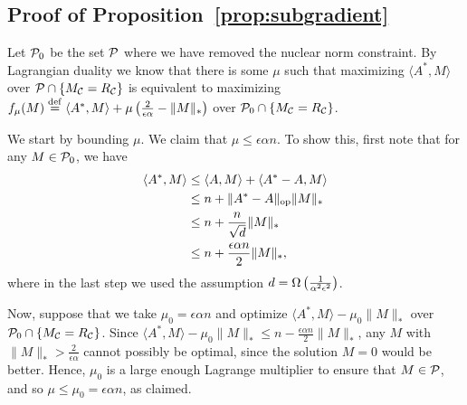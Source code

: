 \documentclass[11pt]{article}
\newcommand{\M}{\tilde{M}}
\newcommand{\Mm}{M^*}
\newcommand{\Aa}{A^*}
\begin{document}

\subsection{Proof of Proposition~\ref{prop:subgradient}}
Let $\mathcal{P}_0$ be the set $\mathcal{P}$ where we have removed the nuclear norm constraint. By Lagrangian duality we 
know that there is some $\mu$ such that maximizing $\langle \Aa, M \rangle$ over $\mathcal{P} \cap \{M_{\mathcal{C}} = R_{\mathcal{C}}\}$ 
is equivalent to maximizing $f_\mu(M) \eqdef \langle \Aa, M \rangle + \mu\p{\frac{2}{\epsilon\alpha} - \|M\|_*}$ over 
$\mathcal{P}_0 \cap \{M_{\mathcal{C}} = R_{\mathcal{C}}\}$. 

We start by bounding $\mu$. We claim that $\mu \leq \epsilon \alpha n$. 
To show this, first note that for any $M \in \mathcal{P}_0$, we have 
\begin{align}
\langle \Aa, M \rangle &\leq \langle A, M \rangle + \langle \Aa - A, M \rangle \\
 &\leq n + \|\Aa - A\|_{\op}\|M\|_* \\
 &\leq n + \frac{n}{\sqrt{d}}\|M\|_* \\
 &\leq n + \frac{\epsilon\alpha n}{2}\|M\|_*,
\end{align}
where in the last step we used the assumption $d = \Omega\left(\frac{1}{\alpha^2\epsilon^2}\right)$.

Now, suppose that we take $\mu_0 = \epsilon \alpha n$ and optimize $\langle \Aa, M \rangle - \mu_0\|M\|_*$ over 
$\mathcal{P}_0 \cap \{M_{\mathcal{C}} = R_{\mathcal{C}}\}$. Since $\langle \Aa, M \rangle - \mu_0\|M\|_* \leq n - \frac{\epsilon \alpha n}{2}\|M\|_*$, 
any $M$ with $\|M\|_* > \frac{2}{\epsilon\alpha}$ cannot possibly be optimal, since the solution $M = 0$ would 
be better. Hence, $\mu_0$ is a large enough Lagrange multiplier to ensure that $M \in \mathcal{P}$, and so 
$\mu \leq \mu_0 = \epsilon \alpha n$, as claimed.
\end{document}
